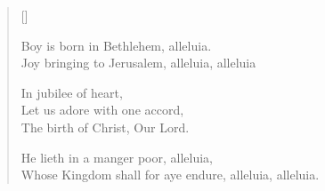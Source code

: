 \newHymn
{}

\begin{verse}[\versewidth]

 Boy is born in Bethlehem, alleluia.\\
Joy bringing to Jerusalem, alleluia, alleluia

 In jubilee of heart,\\
Let us adore with one accord,\\
The birth of Christ, Our Lord.

 He lieth in a manger poor, alleluia,\\
Whose Kingdom shall for aye endure, alleluia, alleluia.

\end{verse}


